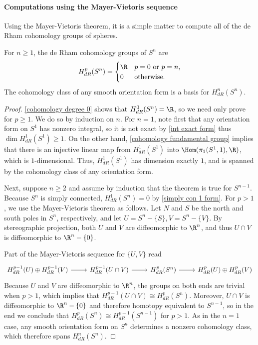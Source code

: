 \paragraph{Computations using the Mayer-Vietoris sequence}
Using the Mayer-Vietoris theorem, it is a simple matter to compute all of the de Rham cohomology groups of spheres.
\begin{theorem}\label{cohomology S^n}
For $n\geq1$, the de Rham cohomology groups of $S^n$ are
\[H^p_{dR}(S^n)=\begin{cases}
\R&\text{$p=0$ or $p=n$},\\
0&\text{otherwise}.
\end{cases}\]
The cohomology class of any smooth orientation form is a basis for $H^n_{dR}(S^n)$.
\end{theorem}
\begin{proof}
\cref{cohomology degree 0} shows that $H^0_{dR}(S^n)=\R$, so we need only prove for $p\geq1$. We do so by induction on $n$. For $n=1$, note first that any orientation form on $S^1$ has nonzero integral, so it is not exact by \cref{int exact form} thus $\dim H^1_{dR}(S^1)\geq 1$. On the other hand, \cref{cohomology fundamental group} implies that there is an injective linear map from $H^1_{dR}(S^1)$ into $\Hom(\pi_1(S^1,1),\R)$, which is $1$-dimensional. Thus, $H^1_{dR}(S^1)$ has dimension exactly $1$, and is spanned by the cohomology class of any orientation form.\par
Next, suppose $n\geq 2$ and assume by induction that the theorem is true for $S^{n-1}$. Because $S^n$ is simply connected, $H^1_{dR}(S^n)=0$ by \cref{simply con 1 form}. For $p>1$, we use the Mayer-Vietoris theorem as follows. Let $N$ and $S$ be the north and south poles in $S^n$, respectively, and let $U=S^n-\{S\},V=S^n-\{V\}$. By stereographic projection, both $U$ and $V$ are diffeomorphic to $\R^n$, and thus $U\cap V$ is diffeomorphic to $\R^n-\{0\}$.\par
Part of the Mayer-Vietoris sequence for $\{U,V\}$ read
\[\begin{tikzcd}
H^{p-1}_{dR}(U)\oplus H^{p-1}_{dR}(V)\ar[r]&H^{p-1}_{dR}(U\cap V)\ar[r]&H^{p}_{dR}(S^n)\ar[r]&H^p_{dR}(U)\oplus H^p_{dR}(V)
\end{tikzcd}\]
Because $U$ and $V$ are diffeomorphic to $\R^n$, the groups on both ends are trivial
when $p>1$, which implies that $H^{p-1}_{dR}(U\cap V)\cong H^p_{dR}(S^n)$. Moreover, $U\cap V$ is diffeomorphic to $\R^n-\{0\}$ and therefore homotopy equivalent to $S^{n-1}$, so in the end we conclude that $H^p_{dR}(S^n)\cong H^{p-1}_{dR}(S^{n-1})$ for $p>1$. As in the $n=1$ case, any smooth orientation form on $S^n$ determines a nonzero cohomology class, which therefore spans $H^n_{dR}(S^n)$.
\end{proof}

